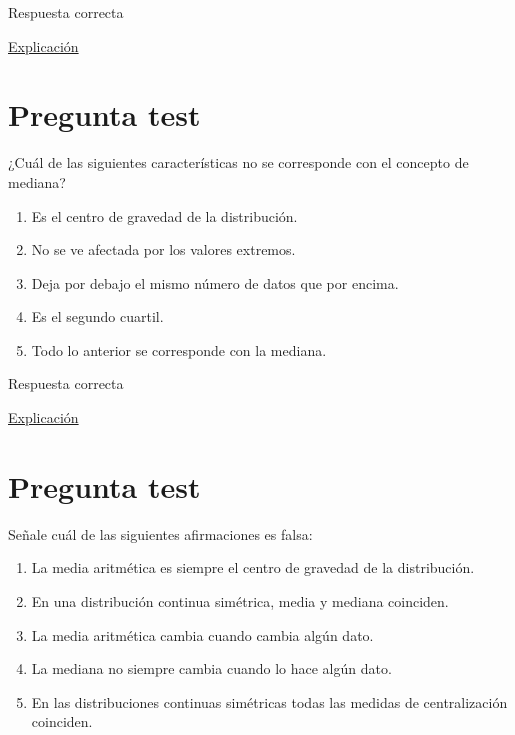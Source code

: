 \documentclass[
]{book}
\providecommand{\tightlist}{%
  \setlength{\itemsep}{0pt}\setlength{\parskip}{0pt}}
\begin{document}
Respuesta correcta

\href{https://1fjmanzano.github.io/bioestadistica/medidas-de-posicio\%CC\%81n-dispersio\%CC\%81n-y-forma.html}{Explicación}

\hypertarget{pregunta-test-62}{%
\section{Pregunta test}\label{pregunta-test-62}}

¿Cuál de las siguientes características no se corresponde con el concepto de mediana?

\begin{enumerate}
\def\labelenumi{\alph{enumi})}
\tightlist
\item
  Es el centro de gravedad de la distribución.
\item
  No se ve afectada por los valores extremos.
\item
  Deja por debajo el mismo número de datos que por encima.
\item
  Es el segundo cuartil.
\item
  Todo lo anterior se corresponde con la mediana.
\end{enumerate}

Respuesta correcta

\href{https://1fjmanzano.github.io/bioestadistica/medidas-de-posicio\%CC\%81n-dispersio\%CC\%81n-y-forma.html\#medidas-de-posicio\%CC\%81n-centrales}{Explicación}

\hypertarget{pregunta-test-63}{%
\section{Pregunta test}\label{pregunta-test-63}}

Señale cuál de las siguientes afirmaciones es falsa:

\begin{enumerate}
\def\labelenumi{\alph{enumi})}
\tightlist
\item
  La media aritmética es siempre el centro de gravedad de la distribución.
\item
  En una distribución continua simétrica, media y mediana coinciden.
\item
  La media aritmética cambia cuando cambia algún dato.
\item
  La mediana no siempre cambia cuando lo hace algún dato.
\item
  En las distribuciones continuas simétricas todas las medidas de centralización coinciden.
\end{enumerate}
\end{document}
